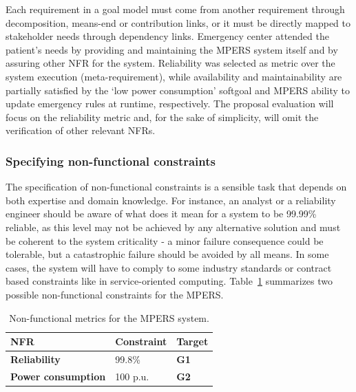 

Each requirement in a goal model must come from another requirement through decomposition, means-end or contribution links, or it must be directly mapped to stakeholder needs through dependency links. Emergency center attended the patient's needs by providing and maintaining the MPERS system itself and by assuring other NFR for the system. Reliability was selected as metric over the system execution (meta-requirement), while availability and maintainability are partially satisfied by the `low power consumption' softgoal and MPERS ability to update emergency rules at runtime, respectively. The proposal evaluation will focus on the reliability metric and, for the sake of simplicity, will omit the verification of other relevant NFRs.

\subsubsection{Specifying non-functional constraints}

The specification of non-functional constraints is a sensible task that depends on both expertise and domain knowledge. For instance, an analyst or a reliability engineer should be aware of what does it mean for a system to be 99.99\% reliable, as this level may not be achieved by any alternative solution and must be coherent to the system criticality - a minor failure consequence could be tolerable, but a catastrophic failure should be avoided by all means. In some cases, the system will have to comply to some industry standards or contract based constraints like in service-oriented computing. Table~\ref{tab:MPERS_NFR} summarizes two possible non-functional constraints for the MPERS.
\medskip

\begin{table}[h]
{\renewcommand{\arraystretch}{1.5}
\begin{tabularx}{\textwidth}{@{}XXX@{}}
\toprule
\textbf{NFR}               & \textbf{Constraint} & \textbf{Target}        \\ \midrule
\textbf{Reliability}       & 99.8\%            & \textbf{G1} \\
\textbf{Power consumption} & 100 p.u.            & \textbf{G2}          \\ \bottomrule
\end{tabularx}
}
\caption{Non-functional metrics for the MPERS system.}
\label{tab:MPERS_NFR}
\end{table}

